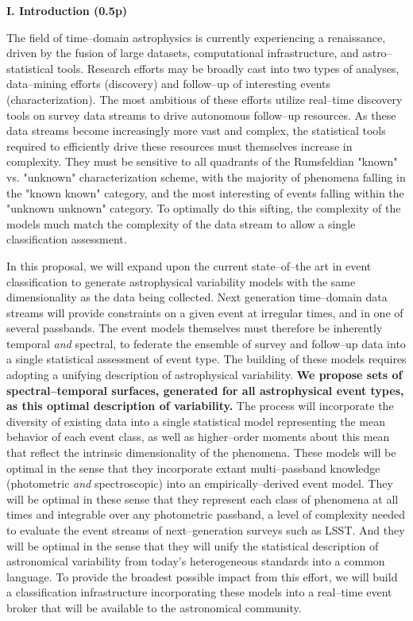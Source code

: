 \centerline{\bf I. Introduction (0.5p)} \smallskip

The field of time--domain astrophysics is currently experiencing a renaissance,
driven by the fusion of large datasets, computational infrastructure, and
astro--statistical tools.  Research efforts may be broadly cast into two types
of analyses, data--mining efforts (discovery) and follow--up of interesting
events (characterization).  The most ambitious of these efforts utilize
real--time discovery tools on survey data streams to drive autonomous follow--up
resources. As these data streams become increasingly more vast and complex, the
statistical tools required to efficiently drive these resources must themselves
increase in complexity.  They must be sensitive to all quadrants of the
Rumsfeldian "known" vs. "unknown" characterization scheme, with the majority of
phenomena falling in the "known known" category, and the most interesting of
events falling within the "unknown unknown" category.  To optimally do this
sifting, the complexity of the models much match the complexity of the data
stream to allow a single classification assessment.

In this proposal, we will expand upon the current state--of--the art in event
classification to generate astrophysical variability models with the same
dimensionality as the data being collected. Next generation time--domain data
streams will provide constraints on a given event at irregular times, and in one
of several passbands.  The event models themselves must therefore be inherently
temporal {\it and} spectral, to federate the ensemble of survey and follow--up
data into a single statistical assessment of event type.  The building of these
models requires adopting a unifying description of astrophysical variability.
{\bf We propose sets of spectral--temporal surfaces, generated for all
astrophysical event types, as this optimal description of variability.}  The
process will incorporate the diversity of existing data into a single
statistical model representing the mean behavior of each event class, as well as
higher--order moments about this mean that reflect the intrinsic dimensionality
of the phenomena.  These models will be optimal in the sense that they
incorporate extant multi--passband knowledge (photometric {\it and}
spectroscopic) into an empirically--derived event model.  They will be optimal
in these sense that they represent each class of phenomena at all times and
integrable over any photometric passband, a level of complexity needed to
evaluate the event streams of next--generation surveys such as LSST. And they
will be optimal in the sense that they will unify the statistical description of
astronomical variability from today's heterogeneous standards into a common
language.  To provide the broadest possible impact from this effort, we will
build a classification infrastructure incorporating these models into a
real--time event broker that will be available to the astronomical community.


